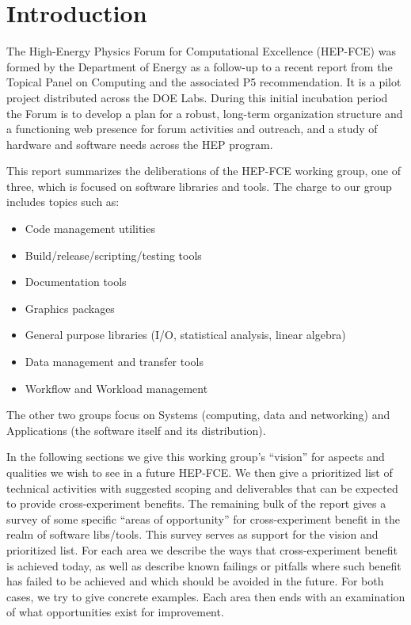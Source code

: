 \section{Introduction}

The High-Energy Physics Forum for Computational Excellence (HEP-FCE)
was formed by the Department of Energy as a follow-up to a recent
report from the Topical Panel on Computing\cite{topicalpanel} and the
associated P5 recommendation\cite{p5}.
%
It is a  pilot project distributed across the DOE Labs.  
%
During this initial incubation period the Forum is to develop a plan
for a robust, long-term organization structure and a functioning web
presence for forum activities and outreach, and a study of hardware
and software needs across the HEP program.

This report summarizes the deliberations of the HEP-FCE working group,
one of three, which is focused on software libraries and tools.  The
charge to our group includes topics such as:

\begin{itemize}
\item Code management utilities
\item Build/release/scripting/testing tools
\item Documentation tools
\item Graphics packages
\item General purpose libraries (I/O, statistical analysis, linear algebra)
\item  Data management and transfer tools
\item  Workflow and Workload management
\end{itemize}

The other two groups focus on Systems (computing, data and networking)
and Applications (the software itself and its distribution).   

In the following sections we give this working group's ``vision'' for
aspects and qualities we wish to see in a future HEP-FCE.  We then
give a prioritized list of technical activities with suggested scoping
and deliverables that can be expected to provide cross-experiment
benefits.  The remaining bulk of the report gives a survey of some
specific ``areas of opportunity'' for cross-experiment benefit in the
realm of software libs/tools.  This survey serves as support for the
vision and prioritized list.  For each area we describe the ways that
cross-experiment benefit is achieved today, as well as describe known
failings or pitfalls where such benefit has failed to be achieved and
which should be avoided in the future.  For both cases, we try to give
concrete examples.  Each area then ends with an examination of what
opportunities exist for improvement.


